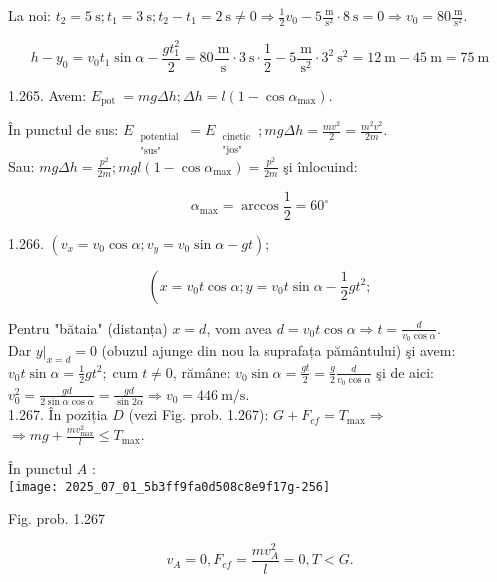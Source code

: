La noi: $t_{2}=5 \mathrm{~s} ; t_{1}=3 \mathrm{~s} ; t_{2}-t_{1}=2 \mathrm{~s} \neq 0 \Rightarrow \frac{1}{2} v_{0}-5 \frac{\mathrm{~m}}{\mathrm{~s}^{2}} \cdot 8 \mathrm{~s}=0 \Rightarrow v_{0}=80 \frac{\mathrm{~m}}{\mathrm{~s}^{2}}$.

$$
h-y_{0}=v_{0} t_{1} \sin \alpha-\frac{g t_{1}^{2}}{2}=80 \frac{\mathrm{~m}}{\mathrm{~s}} \cdot 3 \mathrm{~s} \cdot \frac{1}{2}-5 \frac{\mathrm{~m}}{\mathrm{~s}^{2}} \cdot 3^{2} \mathrm{~s}^{2}=12 \mathrm{~m}-45 \mathrm{~m}=75 \mathrm{~m}
$$

1.265. Avem: $E_{\text {pot }}=m g \Delta h ; \Delta h=l\left(1-\cos \alpha_{\max }\right)$.

În punctul de sus: $E_{\substack{\text { potential } \\ \text { "sus" }}}=E_{\substack{\text { cinetic } \\ \text { "jos" }}} ; m g \Delta h=\frac{m v^{2}}{2}=\frac{m^{2} v^{2}}{2 m}$.\\
Sau: $m g \Delta h=\frac{p^{2}}{2 m} ; m g l\left(1-\cos \alpha_{\max }\right)=\frac{p^{2}}{2 m}$ şi înlocuind:

$$
\alpha_{\max }=\arccos \frac{1}{2}=60^{\circ}
$$

1.266. $\left(v_{x}=v_{0} \cos \alpha ; v_{y}=v_{0} \sin \alpha-g t\right)$;

$$
\left(x=v_{0} t \cos \alpha ; y=v_{0} t \sin \alpha-\frac{1}{2} g t^{2} ;\right.
$$

Pentru "bătaia" (distanța) $x=d$, vom avea $d=v_{0} t \cos \alpha \Rightarrow t=\frac{d}{v_{0} \cos \alpha}$.\\
Dar $\left.y\right|_{x=d}=0$ (obuzul ajunge din nou la suprafața pământului) şi avem:\\
$v_{0} t \sin \alpha=\frac{1}{2} g t^{2} ; \operatorname{cum} t \neq 0$, rămâne: $v_{0} \sin \alpha=\frac{g t}{2}=\frac{g}{2} \frac{d}{v_{0} \cos \alpha}$ şi de aici:\\
$v_{0}^{2}=\frac{g d}{2 \sin \alpha \cos \alpha}=\frac{g d}{\sin 2 \alpha} \Rightarrow v_{0}=446 \mathrm{~m} / \mathrm{s}$.\\
1.267. În poziția $D$ (vezi Fig. prob. 1.267): $G+F_{c f}=T_{\max } \Rightarrow$ $\Rightarrow m g+\frac{m v_{\max }^{2}}{l} \leq T_{\max }$.

În punctul $A$ :\\
\texttt{[image: 2025\_07\_01\_5b3ff9fa0d508c8e9f17g-256]}

Fig. prob. 1.267

$$
v_{A}=0, F_{c f}=\frac{m v_{A}^{2}}{l}=0, T<G .
$$

